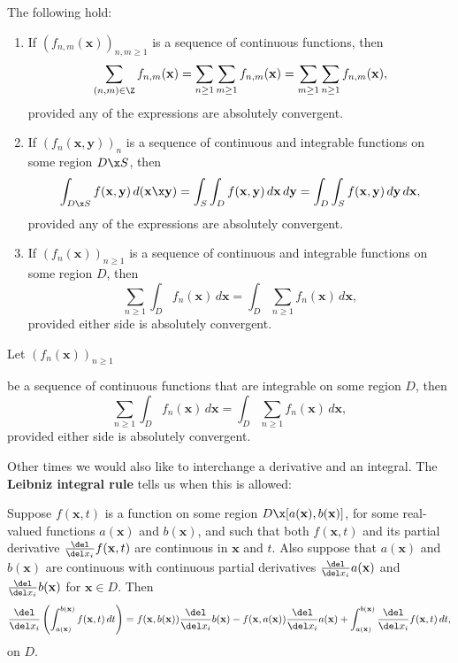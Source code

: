     \begin{theorem}
      The following hold:
      \begin{enumerate}[label=(\roman*)]
        \item If $(f_{n,m}(\mathbf{x}))_{n,m \ge 1}$ is a sequence of continuous functions, then
        \[
          \sum_{(n,m) \in \Z}f_{n,m}(\mathbf{x}) = \sum_{n \ge 1}\sum_{m \ge 1}f_{n,m}(\mathbf{x}) = \sum_{m \ge 1}\sum_{n \ge 1}f_{n,m}(\mathbf{x}),
        \]
        provided any of the expressions are absolutely convergent.
        \item If $(f_{n}(\mathbf{x},\mathbf{y}))_{n}$ is a sequence of continuous and integrable functions on some region $D \x S$, then
        \[
          \int_{D \x S}f(\mathbf{x},\mathbf{y})\,d(\mathbf{x} \x \mathbf{y}) = \int_{S}\int_{D}f(\mathbf{x},\mathbf{y})\,d\mathbf{x}\,d\mathbf{y} = \int_{D}\int_{S}f(\mathbf{x},\mathbf{y})\,d\mathbf{y}\,d\mathbf{x},
        \]
        provided any of the expressions are absolutely convergent.
        \item If $(f_{n}(\mathbf{x}))_{n \ge 1}$ is a sequence of continuous and integrable functions on some region $D$, then
        \[
         \sum_{n \ge 1}\int_{D}f_{n}(\mathbf{x})\,d\mathbf{x} = \int_{D}\sum_{n \ge 1}f_{n}(\mathbf{x})\,d\mathbf{x},
        \]
        provided either side is absolutely convergent.
      \end{enumerate}


      Let $(f_{n}(\mathbf{x}))_{n \ge 1}$
      
      
       be a sequence of continuous functions that are integrable on some region $D$, then
      \[
         \sum_{n \ge 1}\int_{D}f_{n}(\mathbf{x})\,d\mathbf{x} = \int_{D}\sum_{n \ge 1}f_{n}(\mathbf{x})\,d\mathbf{x},
      \]
      provided either side is absolutely convergent.
    \end{theorem}

    Other times we would also like to interchange a derivative and an integral. The \textbf{Leibniz integral rule} tells us when this is allowed:

    \begin{theorem}
      Suppose $f(\mathbf{x},t)$ is a function on some region $D \x [a(\mathbf{x}),b(\mathbf{x})]$, for some real-valued functions $a(\mathbf{x})$ and $b(\mathbf{x})$, and such that both $f(\mathbf{x},t)$ and its partial derivative $\frac{\del}{\del x_{i}}f(\mathbf{x},t)$ are continuous in $\mathbf{x}$ and $t$. Also suppose that $a(\mathbf{x})$ and $b(\mathbf{x})$ are continuous with continuous partial derivatives $\frac{\del}{\del x_{i}}a(\mathbf{x})$ and $\frac{\del}{\del x_{i}}b(\mathbf{x})$ for $\mathbf{x} \in D$. Then
      \[
        \frac{\del}{\del x_{i}}\left(\int_{a(\mathbf{x})}^{b(\mathbf{x})}f(\mathbf{x},t)\,dt\right) = f(\mathbf{x},b(\mathbf{x}))\frac{\del}{\del x_{i}}b(\mathbf{x})-f(\mathbf{x},a(\mathbf{x}))\frac{\del}{\del x_{i}}a(\mathbf{x})+\int_{a(\mathbf{x})}^{b(\mathbf{x})}\frac{\del}{\del x_{i}}f(\mathbf{x},t)\,dt,
      \]
      on $D$.
    \end{theorem}
    
